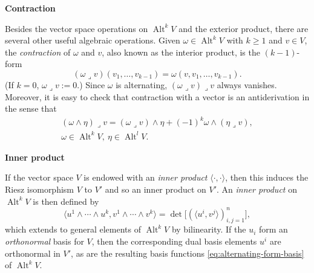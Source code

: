 \medskip\noindent\textbf{{Contraction}}\par
{Besides the vector space operations on $\operatorname{Alt}^kV$ and the exterior product, there are several other useful algebraic operations. Given $\omega\in\operatorname{Alt}^kV$ with $k\geq1$ and $v\in V$, the \emph{contraction} of $\omega$ and $v$, also known as the interior product, is the $(k-1)$-form}
\[
(\omega\lrcorner v)(v_1,\ldots,v_{k-1})=\omega(v,v_1,\ldots,v_{k-1}).
\]
{(If $k=0$, $\omega\lrcorner v:=0$.) Since $\omega$ is alternating, $(\omega\lrcorner v)\lrcorner v$ always vanishes. Moreover, it is easy to check that contraction with a vector is an antiderivation in the sense that}
\[
\begin{gathered}
(\omega\wedge\eta)\lrcorner v=(\omega\lrcorner v)\wedge\eta+(-1)^k\omega\wedge(\eta\lrcorner v),\\
\omega\in\operatorname{Alt}^kV,\ \eta\in\operatorname{Alt}^lV.
\end{gathered}
\]

\medskip\noindent\textbf{{Inner product}}\par
{If the vector space $V$ is endowed with an \emph{inner product} $\langle\cdot,\cdot\rangle$, then this induces the Riesz isomorphism $V$ to $V'$ and so an inner product on $V'$. An \emph{inner product} on $\operatorname{Alt}^kV$ is then defined by}
\[
\langle u^1\wedge\cdots\wedge u^k,v^1\wedge\cdots\wedge v^k\rangle=\det\big[(\langle u^i,v^j\rangle)_{i,j=1}^n\big],
\]
{which extends to general elements of $\operatorname{Alt}^kV$ by bilinearity. If the $u_i$ form an \emph{orthonormal} basis for $V$, then the corresponding dual basis elements $u^i$ are orthonormal in $V'$, as are the resulting basis functions \eqref{eq:alternating-form-basis} of $\operatorname{Alt}^kV$.}

